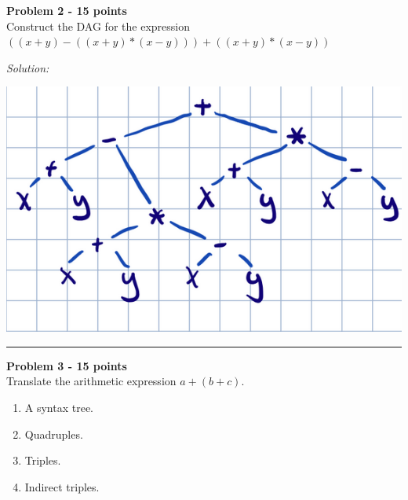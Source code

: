 \documentclass[a4paper, 11pt]{article}
\newenvironment{problem}[2][Problem]
    { \begin{mdframed}[backgroundcolor=gray!20] \textbf{#1 #2} \\}
    {  \end{mdframed}}
\newenvironment{solution}
    {\textit{Solution:}}
    {}
\begin{document}

\begin{problem}{2 - 15 points}
Construct the DAG for the expression  $((x + y )-((x + y )* ( x - y ))) + ((x + y ) * ( x -  y ))$


\end{problem}
\begin{solution}

    \includegraphics{DAG.png}

\end{solution} 
\noindent\rule{7in}{2.8pt}


\begin{problem}{3 - 15 points}
Translate the arithmetic expression $a + ( b + c )$. 

\begin{enumerate}[a]
    \item A syntax tree.  
    \item Quadruples. 
    \item Triples.  
    \item Indirect triples. 
\end{enumerate}
\end{problem}
\end{document}
